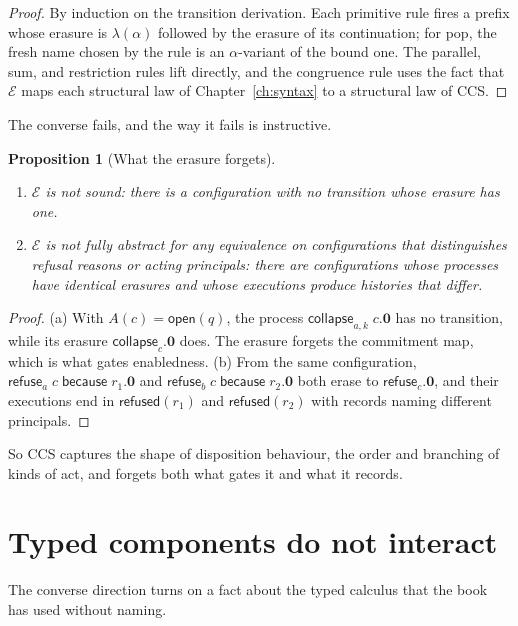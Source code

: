\documentclass[11pt,openany]{book}
\newtheorem{proposition}[theorem]{Proposition}
\theoremstyle{remark}
\begin{document}
\begin{proof}
By induction on the transition derivation. Each primitive rule fires a
prefix whose erasure is $\lambda(\alpha)$ followed by the erasure of its
continuation; for pop, the fresh name chosen by the rule is an
$\alpha$-variant of the bound one. The parallel, sum, and restriction
rules lift directly, and the congruence rule uses the fact that
$\mathcal E$ maps each structural law of Chapter~\ref{ch:syntax} to a
structural law of CCS.
\end{proof}

The converse fails, and the way it fails is instructive.

\begin{proposition}[What the erasure forgets]\label{prop:ccsforget}
\begin{enumerate}[label=(\alph*)]
\item $\mathcal E$ is not sound: there is a configuration with no
transition whose erasure has one.
\item $\mathcal E$ is not fully abstract for any equivalence on
configurations that distinguishes refusal reasons or acting principals:
there are configurations whose processes have identical erasures and
whose executions produce histories that differ.
\end{enumerate}
\end{proposition}

\begin{proof}
(a) With $A(c)=\mathsf{open}(q)$, the process
$\mathsf{collapse}_{a,k}\;c.\mathbf 0$ has no transition, while its
erasure $\mathsf{collapse}_c.\mathbf 0$ does. The erasure forgets the
commitment map, which is what gates enabledness. (b) From the same
configuration, $\mathsf{refuse}_a\;c\;\mathsf{because}\;r_1.\mathbf 0$ and
$\mathsf{refuse}_b\;c\;\mathsf{because}\;r_2.\mathbf 0$ both erase to
$\mathsf{refuse}_c.\mathbf 0$, and their executions end in
$\mathsf{refused}(r_1)$ and $\mathsf{refused}(r_2)$ with records naming
different principals.
\end{proof}

So CCS captures the shape of disposition behaviour, the order and branching
of kinds of act, and forgets both what gates it and what it records.

\section{Typed components do not interact}

The converse direction turns on a fact about the typed calculus that the
book has used without naming.
\end{document}
